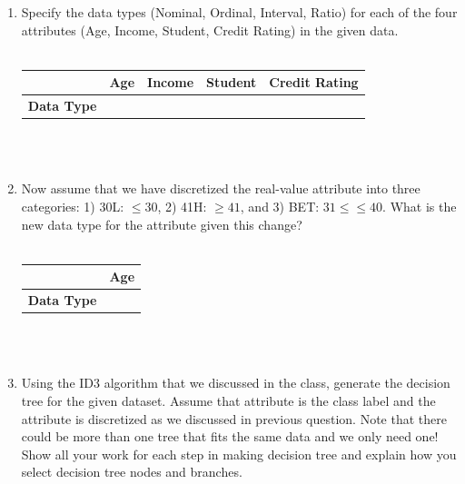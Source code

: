 \documentclass[11pt]{article}
\begin{document}
\begin{enumerate}
    \begin{enumerate}[label=(\alph*)]
        \item Specify the data types (Nominal, Ordinal, Interval, Ratio) for each of the four attributes (Age, Income, Student, Credit Rating) in the given data.\\\\
        \begin{tabular}{ | c | d | d | d | c | } 
            \hline
            & \bf Age & \bf Income & \bf Student & \bf Credit Rating \\ [0.5ex] 
            \hline
            \bf Data Type & & & & \\
            \hline
        \end{tabular} \\\\
        
        \item Now assume that we have discretized the real-value  attribute into three categories: 1) 30L: $\leq 30$, 2) 41H: $\geq 41$, and 3) BET: $31\leq$$\leq 40$. What is the new data type for the  attribute given this change? \\\\
        \begin{tabular}{ | c | d | } 
            \hline
            & \bf Age \\ [0.5ex] 
            \hline
            \bf Data Type & \\
            \hline
        \end{tabular} \\\\
        
        \newpage
        \item Using the ID3 algorithm that we discussed in the class, generate the decision tree for the given dataset. Assume that  attribute is the class
        label and the  attribute is discretized as we discussed in previous question. Note that there could be more than one tree that fits the same data and we only need one! Show all your work for each step in making decision tree and explain how you select decision tree nodes and branches.\vspace{0.2cm}\\ 
        \begin{tabular}{ | m{14cm} | } 
        

\end{tabular}
\end{enumerate}
\end{enumerate}
\end{document}
